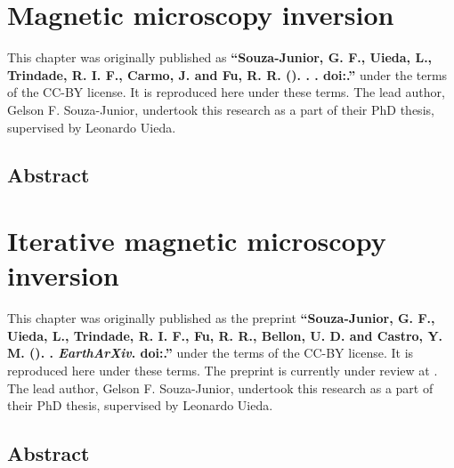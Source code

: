 \documentclass[10pt,a4paper,oneside]{book}
\begin{document}
\chapter{Magnetic microscopy inversion}
\label{chap_micromag}

\begingroup


\begin{summarybox}
    \noindent
    This chapter was originally published as
    \textbf{``Souza-Junior, G. F., Uieda, L., Trindade, R. I. F., Carmo, J. and
        Fu, R. R. (\Year). \Title{}. \textit{\Journal{}}.
    doi:\href{https://doi.org/\JournalDOI}{\JournalDOI}.''} under the
    terms of the CC-BY license. It is reproduced here under these terms.
    The lead author, Gelson F. Souza-Junior, undertook this research as a part
    of their PhD thesis, supervised by Leonardo Uieda.
\end{summarybox}

\section*{Abstract}



\endgroup

\chapter{Iterative magnetic microscopy inversion}
\label{chap_micromag_interf}

\begingroup


\begin{summarybox}
    \noindent
    This chapter was originally published as the preprint
    \textbf{``Souza-Junior, G. F., Uieda, L., Trindade, R. I. F., Fu, R. R.,
    Bellon, U. D. and Castro, Y. M. (\Year). \Title{}. \textit{EarthArXiv}.
    doi:\href{https://doi.org/\PreprintDOI}{\PreprintDOI}.''} under the
    terms of the CC-BY license. It is reproduced here under these terms.
    The preprint is currently under review at \textit{\Journal{}}.
    The lead author, Gelson F. Souza-Junior, undertook this research as a part
    of their PhD thesis, supervised by Leonardo Uieda.
\end{summarybox}

\section*{Abstract}

\end{document}
